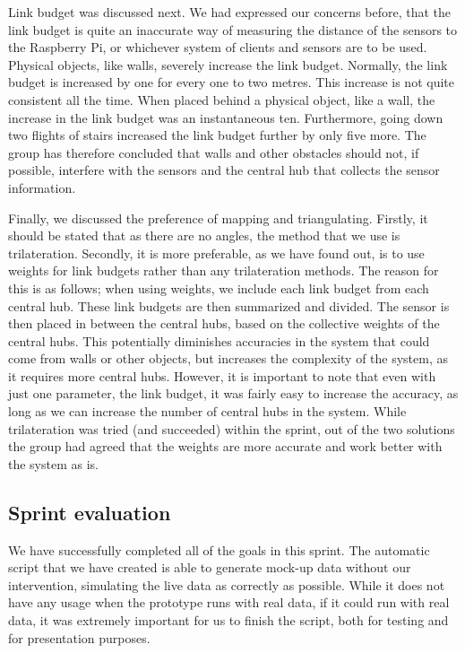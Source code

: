 \documentclass[../document]{subfiles}
\begin{document}
Link budget was discussed next. We had expressed our concerns before, that the link budget is quite an inaccurate way of measuring the distance of the sensors to the \gls{Raspberry Pi}, or whichever system of clients and sensors are to be used. Physical objects, like walls, severely increase the link budget. Normally, the link budget is increased by one for every one to two metres. This increase is not quite consistent all the time. When placed behind a physical object, like a wall, the increase in the link budget was an instantaneous ten. Furthermore, going down two flights of stairs increased the link budget further by only five more. The group has therefore concluded that walls and other obstacles should not, if possible, interfere with the sensors and the central hub that collects the sensor information.

Finally, we discussed the preference of mapping and triangulating. Firstly, it should be stated that as there are no angles, the method that we use is trilateration. Secondly, it is more preferable, as we have found out, is to use weights for link budgets rather than any trilateration methods. The reason for this is as follows; when using weights, we include each link budget from each central hub. These link budgets are then summarized and divided. The sensor is then placed in between the central hubs, based on the collective weights of the central hubs. This potentially diminishes accuracies in the system that could come from walls or other objects, but increases the complexity of the system, as it requires more central hubs. However, it is important to note that even with just one parameter, the link budget, it was fairly easy to increase the accuracy, as long as we can increase the number of central hubs in the system. While trilateration was tried (and succeeded) within the sprint, out of the two solutions the group had agreed that the weights are more accurate and work better with the system as is.

\subsection{Sprint evaluation}

We have successfully completed all of the goals in this sprint. The automatic script that we have created is able to generate mock-up data without our intervention, simulating the live data as correctly as possible. While it does not have any usage when the prototype runs with real data, if it could run with real data, it was extremely important for us to finish the script, both for testing and for presentation purposes.
\end{document}

